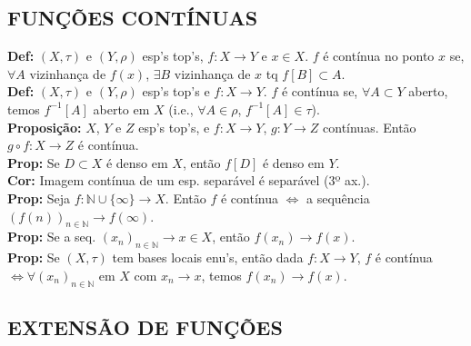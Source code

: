 \documentclass{article}
\begin{document}
\begin{landscape}
\begin{center}
\section{FUNÇÕES CONTÍNUAS}
\end{center}
\begin{multicols}{3}
\textbf{Def:} $(X, \tau)$ e $(Y, \rho)$ esp's top's, $f: X \to Y$ e $x \in X$. $f$ é contínua no ponto $x$ se, $\forall A$ vizinhança de $f(x)$, $\exists B$ vizinhança de $x$ tq $f[B] \subset A$.\\
\textbf{Def:} $(X, \tau)$ e $(Y, \rho)$ esp's top's e $f: X \to Y$. $f$ é contínua se, $\forall A \subset Y$ aberto, temos $f^{-1}[A]$ aberto em $X$ (i.e., $\forall A \in \rho$, $f^{-1}[A] \in \tau$).\\
\textbf{Proposição:} $X$, $Y$ e $Z$ esp's top's, e $f: X \to Y$, $g: Y \to Z$ contínuas. Então $g \circ f: X \to Z$ é contínua.\\
\textbf{Prop:} Se $D \subset X$ é denso em $X$, então $f[D]$ é denso em $Y$.\\
\textbf{Cor:} Imagem contínua de um esp. separável é separável (3º ax.).\\
\textbf{Prop:} Seja $f: \mathbb{N} \cup \{\infty\} \to X$. Então $f$ é contínua $\Leftrightarrow$ a sequência $(f(n))_{n \in \mathbb{N}} \to f(\infty)$.\\
\textbf{Prop:} Se a seq. $(x_n)_{n \in \mathbb{N}} \to x \in X$, então $f(x_n) \to f(x)$.\\
\textbf{Prop:} Se $(X, \tau)$ tem bases locais enu's, então dada $f: X \to Y$, $f$ é contínua $\Leftrightarrow \forall (x_n)_{n \in \mathbb{N}}$ em $X$ com $x_n \to x$, temos $f(x_n) \to f(x)$.

\subsection{EXTENSÃO DE FUNÇÕES}


\end{multicols}
\end{landscape}
\end{document}
